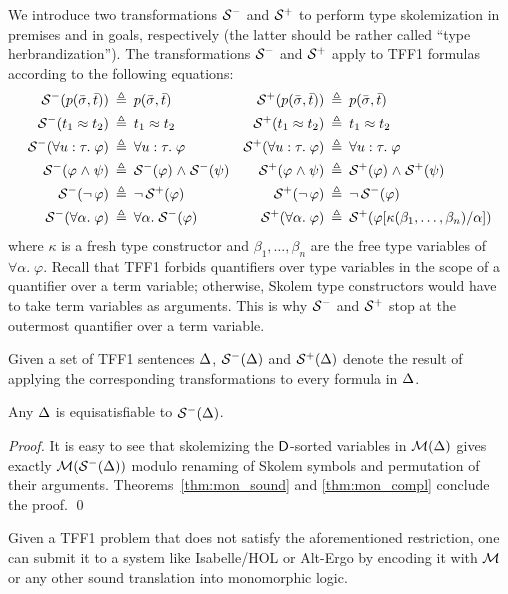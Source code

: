 We introduce two transformations $\mathcal{S}^-$ and $\mathcal{S}^+$ to
perform type skolemization in premises and in goals, respectively
(the latter should be rather called ``type herbrandization'').
The transformations $\mathcal{S}^-$ and $\mathcal{S}^+$ apply to
TFF1 formulas according to the following equations:
\begin{align*}
\mathcal{S}^-(p(\bar{\sigma},\bar{t})) &\:\triangleq\: p(\bar{\sigma},\bar{t}) &
\mathcal{S}^+(p(\bar{\sigma},\bar{t})) &\:\triangleq\: p(\bar{\sigma},\bar{t}) \\
\mathcal{S}^-(t_1 \approx t_2) &\:\triangleq\: t_1 \approx t_2 &
\mathcal{S}^+(t_1 \approx t_2) &\:\triangleq\: t_1 \approx t_2 \\
\mathcal{S}^-(\forall u \mathrel{:} \tau .\; \varphi) &\:\triangleq\: \forall u \mathrel{:} \tau .\; \varphi &
\mathcal{S}^+(\forall u \mathrel{:} \tau .\; \varphi) &\:\triangleq\: \forall u \mathrel{:} \tau .\; \varphi \\
\mathcal{S}^-(\varphi \mathrel{\land} \psi) &\:\triangleq\: \mathcal{S}^-(\varphi) \mathrel{\land} \mathcal{S}^-(\psi) &
\mathcal{S}^+(\varphi \mathrel{\land} \psi) &\:\triangleq\: \mathcal{S}^+(\varphi) \mathrel{\land} \mathcal{S}^+(\psi) \\
\mathcal{S}^-(\lnot\, \varphi) &\:\triangleq\: \lnot\, \mathcal{S}^+(\varphi) &
\mathcal{S}^+(\lnot\, \varphi) &\:\triangleq\: \lnot\, \mathcal{S}^-(\varphi) \\
\mathcal{S}^-(\forall \alpha .\; \varphi) &\:\triangleq\: \forall \alpha .\; \mathcal{S}^-(\varphi) &
\mathcal{S}^+(\forall \alpha .\; \varphi) &\:\triangleq\:
\mathcal{S}^+(\varphi[\kappa(\beta_1,\dots,\beta_n)/\alpha])
\end{align*}
where $\kappa$ is a fresh type constructor and $\beta_1,\dots,\beta_n$ are
the free type variables of $\forall \alpha .\; \varphi$.
Recall that TFF1 forbids quantifiers over type variables in the scope
of a quantifier over a term variable; otherwise, Skolem type constructors
would have to take term variables as arguments. This is why $\mathcal{S}^-$ and
$\mathcal{S}^+$ stop at the outermost quantifier over a term variable.

Given a set of TFF1 sentences $\mathrm{\Delta}$,
$\mathcal{S}^-(\mathrm{\Delta})$ and $\mathcal{S}^+(\mathrm{\Delta})$ denote the result of applying
the corresponding transformations to every formula in $\mathrm{\Delta}$.

\begin{theorem} \label{thm:sko}
Any $\mathrm{\Delta}$ is equisatisfiable to $\mathcal{S}^-(\mathrm{\Delta})$.
\end{theorem}
\begin{proof}
It is easy to see that
skolemizing the $\mathsf{D}$-sorted variables in $\mathcal{M}(\mathrm{\Delta})$ gives
exactly $\mathcal{M}(\mathcal{S}^-(\mathrm{\Delta}))$ modulo renaming of Skolem symbols and
permutation of their arguments. Theorems~\ref{thm:mon_sound} and
\ref{thm:mon_compl} conclude the proof.
\qed
\end{proof}

Given a TFF1 problem that does not satisfy the aforementioned restriction,
one can submit it to a system like Isabelle/HOL or Alt-Ergo by encoding it
with $\mathcal{M}$ or any other sound translation into monomorphic logic.

